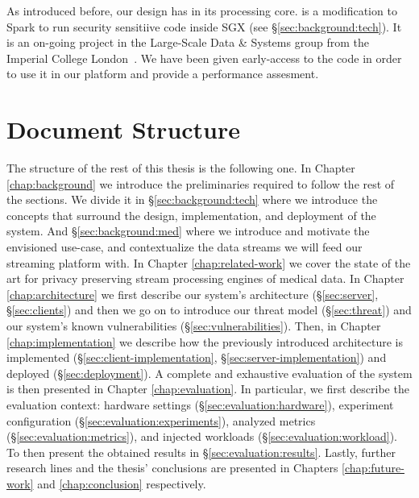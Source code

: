 As introduced before, our design has \sgxspark in its processing core.
\sgxspark is a modification to Spark to run security sensitiive code inside SGX (see \S\ref{sec:background:tech}).
It is an on-going project in the Large-Scale Data \& Systems group from the Imperial College London~\cite{lsds}.
We have been given early-access to the code in order to use it in our platform and provide a performance assesment.

\section{Document Structure}

The structure of the rest of this thesis is the following one.
In Chapter \ref{chap:background} we introduce the preliminaries required to follow the rest of the sections.
We divide it in \S\ref{sec:background:tech} where we introduce the concepts that surround the design, implementation, and deployment of the system.
And \S\ref{sec:background:med} where we introduce and motivate the envisioned use-case, and contextualize the data streams we will feed our streaming platform with.
In Chapter \ref{chap:related-work} we cover the state of the art for privacy preserving stream processing engines of medical data.
In Chapter \ref{chap:architecture} we first describe our system's architecture (\S\ref{sec:server}, \S\ref{sec:clients}) and then we go on to introduce our threat model (\S\ref{sec:threat}) and our system's known vulnerabilities (\S\ref{sec:vulnerabilities}).
Then, in Chapter \ref{chap:implementation} we describe how the previously introduced architecture is implemented (\S\ref{sec:client-implementation}, \S\ref{sec:server-implementation}) and deployed (\S\ref{sec:deployment}).
A complete and exhaustive evaluation of the system is then presented in Chapter \ref{chap:evaluation}.
In particular, we first describe the evaluation context: hardware settings (\S\ref{sec:evaluation:hardware}), experiment configuration (\S\ref{sec:evaluation:experiments}), analyzed metrics (\S\ref{sec:evaluation:metrics}), and injected workloads (\S\ref{sec:evaluation:workload}).
To then present the obtained results in \S\ref{sec:evaluation:results}.
Lastly, further research lines and the thesis' conclusions are presented in Chapters \ref{chap:future-work} and \ref{chap:conclusion} respectively.
